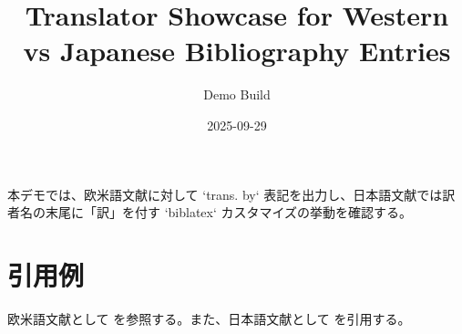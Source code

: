 \documentclass[a4paper]{jlreq}
\title{Translator Showcase for Western vs Japanese Bibliography Entries}
\author{Demo Build}
\date{2025-09-29}
\begin{document}
\maketitle

本デモでは、欧米語文献に対して `trans. by` 表記を出力し、日本語文献では訳者名の末尾に「訳」を付す `biblatex` カスタマイズの挙動を確認する。

\section*{引用例}
欧米語文献として \textcite{nowak2018} を参照する。また、日本語文献として \textcite{kant2022} を引用する。

\printbibliography
\end{document}
